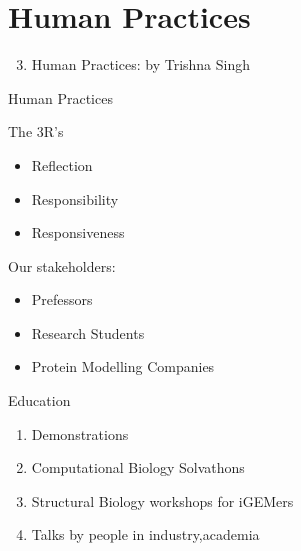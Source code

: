 \section*{Human Practices}

\begin{frame}
    \begin{enumerate}
        \setcounter{enumi}{2}
        \item Human Practices: by Trishna Singh
    \end{enumerate}
\end{frame}

\begin{frame}{Human Practices}
    \begin{block}{The 3R's}
        \begin{itemize}
            \item Reflection
            \item Responsibility
            \item Responsiveness
        \end{itemize}
    \end{block}

    Our stakeholders:
    \begin{itemize}
        \item Prefessors
        \item Research Students
        \item Protein Modelling Companies
    \end{itemize}
\end{frame}

\begin{frame}{Education}
    \begin{enumerate}
        \item Demonstrations
        \item Computational Biology Solvathons
        \item Structural Biology workshops for iGEMers
        \item Talks by people in industry,academia
    \end{enumerate}    
\end{frame}